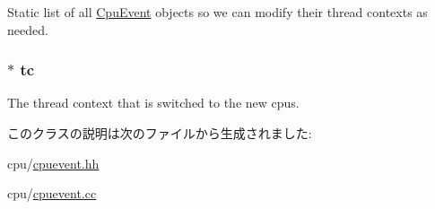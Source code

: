 Static list of all \hyperlink{classCpuEvent}{CpuEvent} objects so we can modify their thread contexts as needed. \hypertarget{classCpuEvent_a4455a4759e69e5ebe68ae7298cbcc37d}{
\subsubsection[{tc}]{$\ast$ {\bf tc}}}
\label{classCpuEvent_a4455a4759e69e5ebe68ae7298cbcc37d}
The thread context that is switched to the new cpus. 

このクラスの説明は次のファイルから生成されました:\begin{DoxyCompactItemize}
\item 
cpu/\hyperlink{cpuevent_8hh}{cpuevent.hh}\item 
cpu/\hyperlink{cpuevent_8cc}{cpuevent.cc}\end{DoxyCompactItemize}
